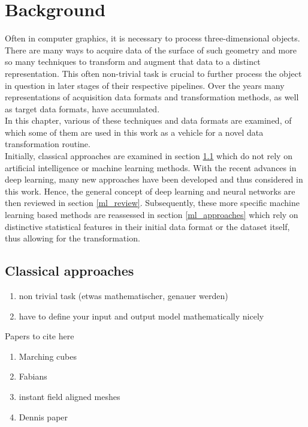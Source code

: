 \chapter{Background}
\label{sec:background}
Often in computer graphics, it is necessary to process three-dimensional objects. There are many ways to acquire data of the surface of such geometry and more so many techniques to transform and augment that data to a distinct representation. This often non-trivial task is crucial to further process the object in question in later stages of their respective pipelines. Over the years many representations of acquisition data formats and transformation methods, as well as target data formats, have accumulated.\\
In this chapter, various of these techniques and data formats are examined, of which some of them are used in this work as a vehicle for a novel data transformation routine.\\
Initially, classical approaches are examined in section \ref{classic_approaches} which do not rely on artificial intelligence or machine learning methods.
With the recent advances in deep learning, many new approaches have been developed and thus considered in this work. Hence, the general concept of deep learning and neural networks are then reviewed in section \ref{ml_review}.
Subsequently, these more specific machine learning based methods are reassessed in section \ref{ml_approaches} which rely on distinctive statistical features in their initial data format or the dataset itself, thus allowing for the transformation.
\section{Classical approaches}
\label{classic_approaches}
\begin{enumerate}
  \item non trivial task  (etwas mathematischer, genauer werden)
  \item have to define your input and output model mathematically nicely
\end{enumerate}
Papers to cite here
\begin{enumerate}
  \item Marching cubes
  \item Fabians \cite{Groh2017}
  \item instant field aligned meshes
  \item Dennis paper\cite{bukenberger2018hierarchical}
\end{enumerate}


